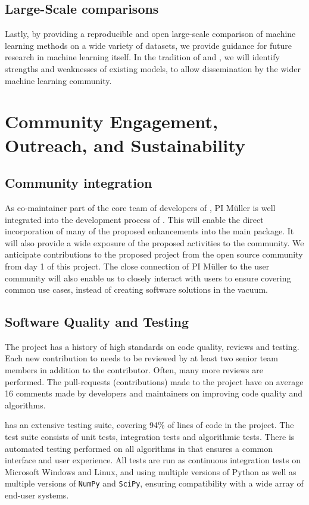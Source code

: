 \subsection{Large-Scale comparisons}
Lastly, by providing a reproducible and open large-scale comparison of machine learning
methods on a wide variety of datasets, we provide guidance for future research
in machine learning itself.
In the tradition of \textcite{caruana2006empirical} and
\textcite{caruana2008empirical}, we will identify strengths and weaknesses of
existing models, to allow dissemination by the wider machine learning
community.

\section{Community Engagement, Outreach, and Sustainability}
\subsection{Community integration}
As co-maintainer part of the core team of developers of \sklearn{}, PI
M\"uller is well integrated into the development process of \sklearn{}.
This will enable the direct incorporation of many of the proposed enhancements
into the \sklearn{} main package.
It will also provide a wide exposure of the proposed activities to the
\sklearn{} community. We anticipate contributions to the proposed
project from the open source community from day 1 of this project.
The close connection of PI M\"uller to the \sklearn{} user community will
also enable us to closely interact with users to ensure covering common use cases,
instead of creating software solutions in the vacuum.

\subsection{Software Quality and Testing}
The \sklearn{} project has a history of high standards on code quality, reviews and testing.
Each new contribution to \sklearn{} needs to be reviewed by at least two senior team members
in addition to the contributor. Often, many more reviews are performed. The
pull-requests (contributions) made to the project have on average 16 comments
made by developers and maintainers on improving code quality and algorithms.

\sklearn{} has an extensive testing suite, covering 94\% of lines of code in the project.
The test suite consists of unit tests, integration tests and algorithmic tests.
There is automated testing performed on all algorithms in \sklearn{} that ensures a common
interface and user experience.
All tests are run as continuous integration tests on Microsoft Windows and Linux, and using
multiple versions of Python as well as multiple versions of \texttt{NumPy} and \texttt{SciPy}, ensuring
compatibility with a wide array of end-user systems.

